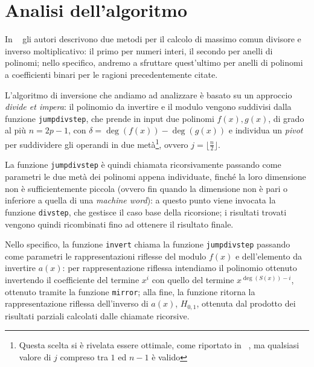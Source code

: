 \section{Analisi dell'algoritmo}\label{analisi}
In ~\cite{bernstein2019fast} gli autori descrivono due metodi per il calcolo di massimo comun divisore e inverso moltiplicativo: il primo per numeri interi,
il secondo per anelli di polinomi; nello specifico, andremo a sfruttare quest'ultimo per anelli di polinomi a coefficienti binari per le ragioni precedentemente citate.

L'algoritmo di inversione che andiamo ad analizzare è basato su un approccio \textit{divide et impera}: il polinomio da invertire e il modulo vengono suddivisi dalla funzione
\texttt{jumpdivstep}, che prende in input due polinomi $f(x), g(x)$, di grado al più $n=2p-1$, con $\delta = \deg{(f(x))} - \deg{(g(x))}$ e individua
un \textit{pivot} per suddividere gli operandi in due metà\footnote{Questa scelta si è rivelata essere ottimale, come riportato in ~\cite{barenghi2020comprehensive}, ma 
qualsiasi valore di $j$ compreso tra $1$ ed $n-1$ è valido}, ovvero $j = \lfloor \frac{n}{2} \rfloor$. 

La funzione \texttt{jumpdivstep} è quindi chiamata ricorsivamente passando come parametri le due 
metà dei polinomi appena individuate, finché la loro dimensione non è sufficientemente piccola (ovvero fin quando la dimensione non è pari o inferiore a quella di una \textit{machine word}):
a questo punto viene invocata la funzione \texttt{divstep}, che gestisce il caso base della ricorsione;
i risultati trovati vengono quindi ricombinati fino ad ottenere il risultato finale.

Nello specifico, la funzione \texttt{invert} chiama la funzione \texttt{jumpdivstep} passando come parametri le rappresentazioni riflesse del modulo $f(x)$ e dell'elemento da invertire $a(x)$: per rappresentazione riflessa
intendiamo il polinomio ottenuto invertendo il coefficiente del termine $x^i$ con quello del termine $x^{\deg(S(x))-i}$, ottenuto tramite la funzione \texttt{mirror}; alla fine, la funzione
ritorna la rappresentazione riflessa dell'inverso di $a(x)$, $H_{0,1}$, ottenuta dal prodotto dei risultati parziali calcolati dalle chiamate ricorsive.

